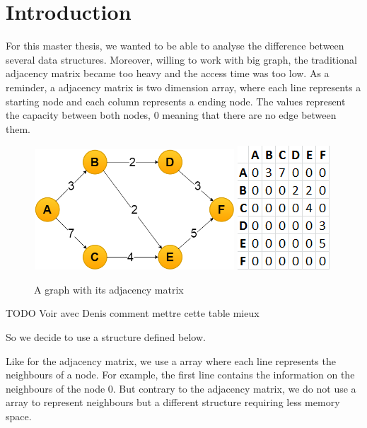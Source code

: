 \section{Introduction}
For this master thesis, we wanted to be able to analyse the difference between several data structures. Moreover, willing to work with big graph, the traditional adjacency matrix became too heavy and the access time was too low. As a reminder, a adjacency matrix is two dimension array, where each line represents a starting node and each column represents a ending node. The values represent the capacity between both nodes, 0 meaning that there are no edge between them. \newline

\begin{figure}[!h]
\includegraphics[width=7.5cm,height=4.5cm]{images/graph.png}
\includegraphics[scale=0.7]{images/adjacencyMatrix.png}
\caption{A graph with its adjacency matrix}
\end{figure}

TODO Voir avec Denis comment mettre cette table mieux \newline


So we decide to use a structure defined below. \newline

Like for the adjacency matrix, we use a array where each line represents the neighbours of a node. For example, the first line contains the information on the neighbours of the node 0. But contrary to the adjacency matrix, we do not use a array to represent neighbours but a different structure requiring less memory space. \newline

